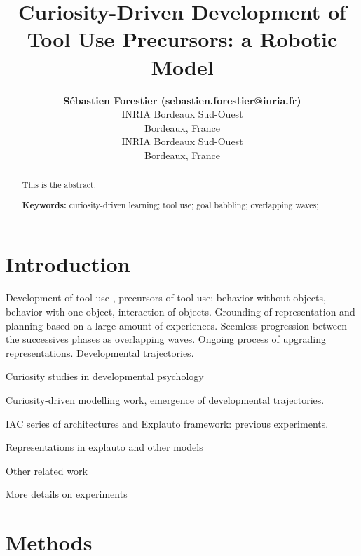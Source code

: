 \documentclass[10pt,letterpaper]{article}
\title{Curiosity-Driven Development of Tool Use Precursors: a Robotic Model}
\author{{\large \bf S\'ebastien Forestier (sebastien.forestier@inria.fr)} \\
	INRIA Bordeaux Sud-Ouest\\
	Bordeaux, France
  \AND {\large \bf Pierre-Yves Oudeyer (pierre-yves.oudeyer@inria.fr)} \\
	INRIA Bordeaux Sud-Ouest\\
	Bordeaux, France}
\begin{document}
\maketitle


\begin{abstract}
This is the abstract.

\textbf{Keywords:} 
curiosity-driven learning; tool use; goal babbling; overlapping waves; 
\end{abstract}


\section{Introduction}

	Development of tool use \cite{guerin2013survey}, precursors of tool use: behavior without objects, behavior with one object, interaction of objects.	
	Grounding of representation and planning based on a large amount of experiences. 	
	Seemless progression between the successives phases as overlapping waves. 	
	Ongoing process of upgrading representations.	
	Developmental trajectories.
	
	
	Curiosity studies in developmental psychology 
	\cite{kidd}
	\cite{gottlieb_information-seeking_2013}
	
	Curiosity-driven modelling work, emergence of developmental trajectories.
	\cite{oudeyer_intrinsic_2007} 
	\cite{oudeyer_what_2007}
	\cite{flow}
	\cite{sch}
	\cite{santucci2013}
	\cite{cangelosi2010integration}
	\cite{oudeyer2014evolution}
	
	
	IAC series of architectures and Explauto framework: previous experiments.
	\cite{moulin-frier_self-organization_2014}
	\cite{moulin-frier_explauto:_2014}
	\cite{baranes2010intrinsically}
	\cite{riac}
	\cite{baranes_active_2013}
	
	Representations in explauto and other models 
	\cite{mugan2009}
	\cite{metzen2013}
	\cite{horde}
	\cite{mugan}
	\cite{vig}
	\cite{sutton1999between}
	
	Other related work
	\cite{ugur2015}
	\cite{schmerlinggoal}

	More details on experiments
	\cite{ijspeert_dynamical_2013}
	
	\cite{forestier2015}
	\cite{unifying}
	\cite{}
	
%

\section{Methods}
\end{document}
